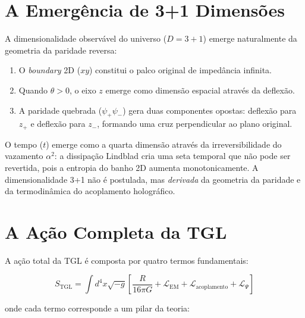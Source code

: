 \documentclass[12pt,a4paper,twoside]{article}
\newcommand{\alphaii}{\alpha^{2}}
\newcommand{\Psifield}{\Psi}
\newcommand{\psion}{\psi}
\newcommand{\boundary}{\textit{boundary}}
\begin{document}
\section{A Emerg\^encia de 3+1 Dimens\~oes}


A dimensionalidade observ\'avel do universo ($D = 3+1$) emerge naturalmente da geometria da paridade reversa:

\begin{enumerate}[nosep]
\item O \boundary{} 2D ($xy$) constitui o palco original de imped\^ancia infinita.
\item Quando $\theta > 0$, o eixo $z$ emerge como dimens\~ao espacial atrav\'es da deflex\~ao.
\item A paridade quebrada ($\psion_+\psion_-$) gera duas componentes opostas: deflex\~ao para $z_+$ e deflex\~ao para $z_-$, formando uma cruz perpendicular ao plano original.
\end{enumerate}

O tempo ($t$) emerge como a quarta dimens\~ao atrav\'es da irreversibilidade do vazamento $\alphaii$: a dissipa\c{c}\~ao Lindblad cria uma seta temporal que n\~ao pode ser revertida, pois a entropia do banho 2D aumenta monotonicamente. A dimensionalidade 3+1 n\~ao \'e postulada, mas \textit{derivada} da geometria da paridade e da termodin\^amica do acoplamento hologr\'afico.


\section{A A\c{c}\~ao Completa da TGL}


A a\c{c}\~ao total da TGL \'e composta por quatro termos fundamentais:

\begin{equationbox}[title={A\c{c}\~ao Completa da TGL}]
\begin{equation}
S_{\text{TGL}} = \int d^4x \sqrt{-g}\left[\frac{R}{16\pi G} + \mathcal{L}_{\text{EM}} + \mathcal{L}_{\text{acoplamento}} + \mathcal{L}_\Psifield\right]
\label{eq:acao_completa}
\end{equation}
\end{equationbox}

\noindent onde cada termo corresponde a um pilar da teoria:
\end{document}
